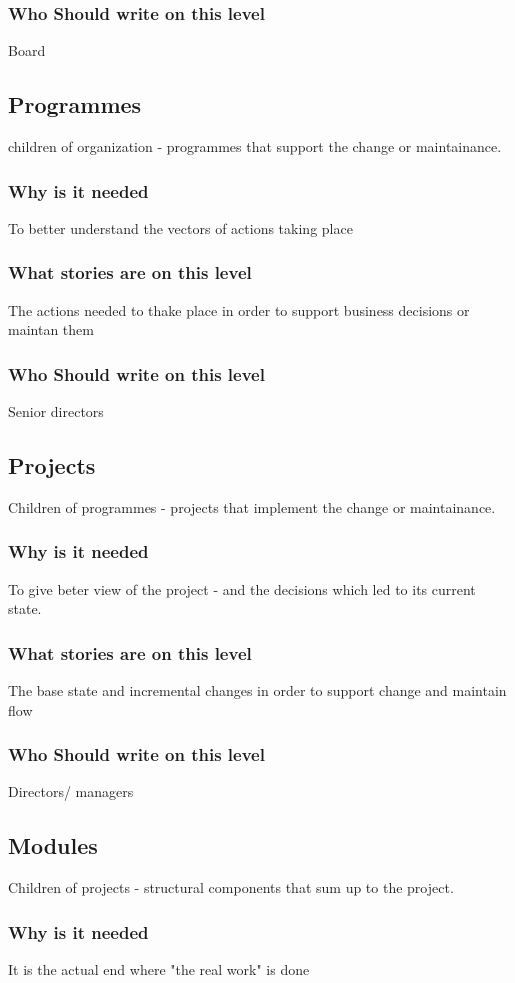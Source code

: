 \subsubsection{Who Should write on this level}
Board
\subsection{Programmes}
children of organization - programmes that support the change or maintainance.
\subsubsection{Why is it needed}
To better understand the vectors of actions taking place
\subsubsection{What stories are on this level}
The actions needed to thake place in order to support business decisions or maintan them
\subsubsection{Who Should write on this level}
Senior directors
\subsection{Projects}
Children of programmes - projects that implement the change or maintainance.
\subsubsection{Why is it needed}
To give beter view of the project - and the decisions which led to its current state. 
\subsubsection{What stories are on this level}
The base state and incremental changes in order to support change and maintain flow
\subsubsection{Who Should write on this level}
Directors/ managers
\subsection{Modules}
Children of projects - structural components that sum up to the project.
\subsubsection{Why is it needed}
It is the actual end where "the real work" is done

